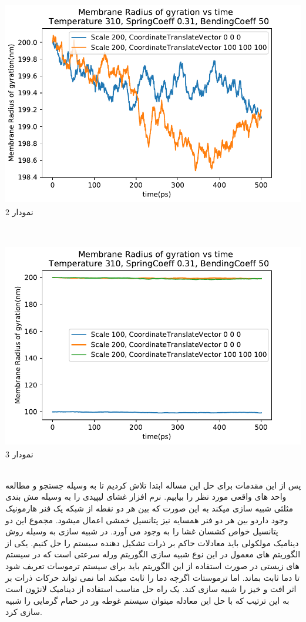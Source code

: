 \documentclass[12pt,onecolumn,a4paper]{report}
\begin{document}
\begin{center}
\includegraphics[width=16cm, height=9cm]{2.pdf}\\
\caption{نمودار 2}
\end{center}\\
\begin{center}
\includegraphics[width=16cm, height=9cm]{3.pdf}\\
\caption{نمودار 3}
\end{center}\\
پس از این مقدمات
برای حل این مساله ابتدا تلاش کردیم تا به وسیله جستجو و مطالعه واحد های واقعی مورد نظر را بیابیم. نرم افزار غشای لیپیدی را به وسیله مش بندی مثلثی شبیه سازی میکند به این صورت که بین هر دو نقطه از شبکه یک فنر هارمونیک وجود داردو بین هر دو فنر همسایه نیز پتانسیل خمشی اعمال میشود. مجموع این دو پتانسیل خواص کشسان غشا را به وجود می آورد.
در شبیه سازی به وسیله روش دینامیک مولکولی باید معادلات حاکم بر ذرات تشکیل دهنده سیستم را حل کنیم. یکی از الگوریتم های معمول در این نوع شبیه سازی الگوریتم ورله سرعتی است که در سیستم های زیستی  در صورت استفاده از این الگوریتم باید برای سیستم ترموسات تعریف شود تا دما ثابت بماند. اما ترموستات اگرچه دما را ثابت میکند اما نمی تواند حرکات ذرات بر اثر افت و خیز را شبیه سازی کند. یک راه حل مناسب استفاده از دینامیک لانژون است به این ترتیب که با حل این معادله میتوان سیستم غوطه ور در حمام گرمایی را شبیه سازی کرد.\\
\end{document}
